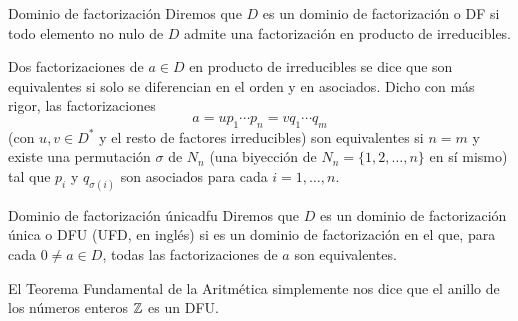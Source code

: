 \begin{definition}{Dominio de factorización}{}
Diremos que \(D\) es un dominio de factorización o DF si todo elemento no nulo de \(D\) admite una factorización en producto de irreducibles.
\end{definition}

Dos factorizaciones de \(a \in D\) en producto de irreducibles se dice que son equivalentes si solo se diferencian en el orden y en asociados. Dicho con más rigor, las factorizaciones
\[
a = u p_1 \cdots p_n = v q_1 \cdots q_m
\]
(con \(u, v \in D^*\) y el resto de factores irreducibles) son equivalentes si \(n = m\) y existe una permutación \(\sigma\) de \(N_n\) (una biyección de \(N_n = \{1, 2, \ldots, n\}\) en sí mismo) tal que \(p_i\) y \(q_{\sigma(i)}\) son asociados para cada \(i = 1, \ldots, n\).

\begin{definition}{Dominio de factorización única}{dfu}
Diremos que \(D\) es un dominio de factorización única o DFU (UFD, en inglés) si es un dominio de factorización en el que, para cada \(0 \neq a \in D\), todas las factorizaciones de \(a\) son equivalentes.
\end{definition}

\begin{example}{}{}
El Teorema Fundamental de la Aritmética simplemente nos dice que el anillo de los números enteros \( \mathbb{Z} \) es un DFU.
\end{example}

